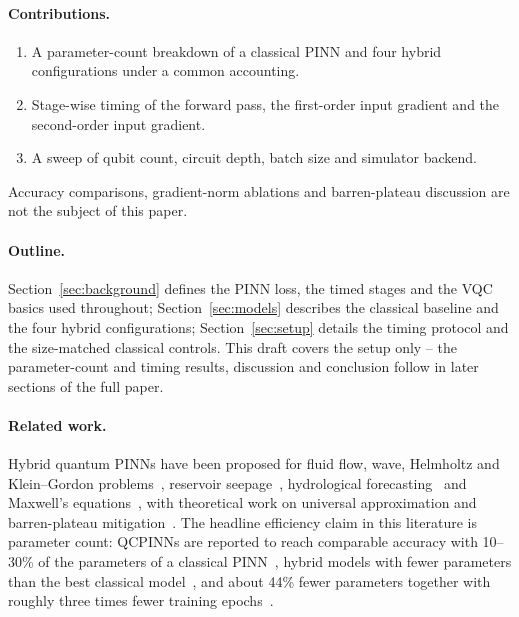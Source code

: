 \paragraph{Contributions.}
\begin{enumerate}
  \item A parameter-count breakdown of a classical PINN and four hybrid configurations under a common
  accounting.
  \item Stage-wise timing of the forward pass, the first-order input gradient and the second-order
  input gradient.
  \item A sweep of qubit count, circuit depth, batch size and simulator backend.
\end{enumerate}
Accuracy comparisons, gradient-norm ablations and barren-plateau discussion are not the subject of
this paper.

\paragraph{Outline.} Section~\ref{sec:background} defines the PINN loss, the timed stages and the VQC basics
used throughout; Section~\ref{sec:models} describes the classical baseline and the four hybrid configurations;
Section~\ref{sec:setup} details the timing protocol and the size-matched classical controls. This draft covers
the setup only -- the parameter-count and timing results, discussion and conclusion follow in later sections
of the full paper.

\paragraph{Related work.}
Hybrid quantum PINNs have been proposed for fluid flow, wave, Helmholtz and Klein--Gordon
problems~\cite{farea2025,leong2025}, reservoir seepage~\cite{rao2025}, hydrological
forecasting~\cite{hewage2026} and Maxwell's equations~\cite{chen2025}, with theoretical work on universal
approximation and barren-plateau mitigation~\cite{lantigua2025}. The headline efficiency claim in this literature is
parameter count: QCPINNs are reported to reach comparable accuracy with 10--30\% of the parameters of a classical
PINN~\cite{farea2025}, hybrid models with fewer parameters than the best classical model~\cite{leong2025,trahan2024},
and about 44\% fewer parameters together with roughly three times fewer training epochs~\cite{hewage2026}.

